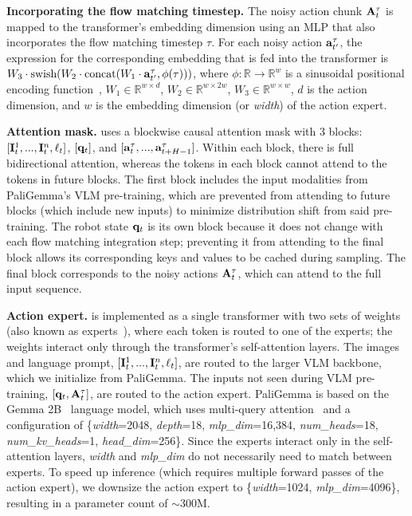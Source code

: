 \textbf{Incorporating the flow matching timestep.} The noisy action chunk $\mathbf{A}^\tau_t$ is mapped to the transformer's embedding dimension using an MLP that also incorporates the flow matching timestep $\tau$. For each noisy action $\mathbf{a}^\tau_{t'}$, the expression for the corresponding embedding that is fed into the transformer is \mbox{$W_3 \cdot \text{swish} (W_2 \cdot \text{concat} (W_1 \cdot \mathbf{a}^\tau_{t'}, \phi(\tau)))$}, where $\phi : \mathbb{R} \to \mathbb{R}^w$ is a sinusoidal positional encoding function~\citep{vaswani2017attention}, $W_1 \in \mathbb{R}^{w \times d}$, $W_2 \in \mathbb{R}^{w \times 2w}$, $W_3 \in \mathbb{R}^{w \times w}$, $d$ is the action dimension, and $w$ is the embedding dimension (or \textit{width}) of the action expert.

\textbf{Attention mask.} \ModelSymbol{} uses a blockwise causal attention mask with 3 blocks: $[\mathbf{I}^1_t, ..., \mathbf{I}^n_t, \ell_t]$, $[\mathbf{q}_t]$, and $[\mathbf{a}^\tau_t, ..., \mathbf{a}^\tau_{t+H-1}]$. Within each block, there is full bidirectional attention, whereas the tokens in each block cannot attend to the tokens in future blocks. The first block includes the input modalities from PaliGemma's VLM pre-training, which are prevented from attending to future blocks (which include new inputs) to minimize distribution shift from said pre-training. The robot state $\mathbf{q}_t$ is its own block because it does not change with each flow matching integration step; preventing it from attending to the final block allows its corresponding keys and values to be cached during sampling. The final block corresponds to the noisy actions $\mathbf{A}^\tau_t$, which can attend to the full input sequence.

\textbf{Action expert.} \ModelSymbol{} is implemented as a single transformer with two sets of weights (also known as experts~\citep{shazeer2017outrageously}), where each token is routed to one of the experts; the weights interact only through the transformer's self-attention layers. The images and language prompt, $[\mathbf{I}^1_t, ..., \mathbf{I}^n_t, \ell_t]$, are routed to the larger VLM backbone, which we initialize from PaliGemma.  The inputs not seen during VLM pre-training, $[\mathbf{q}_t, \mathbf{A}^\tau_t]$, are routed to the action expert. PaliGemma is based on the Gemma 2B~\citep{team2024gemma} language model, which uses multi-query attention~\citep{shazeer2019fast} and a configuration of \{\textit{width}=2048, \textit{depth}=18, \textit{mlp\_dim}=16,384, \textit{num\_heads}=18, \textit{num\_kv\_heads}=1, \textit{head\_dim}=256\}. Since the experts interact only in the self-attention layers, \textit{width} and \textit{mlp\_dim} do not necessarily need to match between experts. To speed up inference (which requires multiple forward passes of the action expert), we downsize the action expert to \{\textit{width}=1024, \textit{mlp\_dim}=4096\}, resulting in a parameter count of $\sim$300M.

